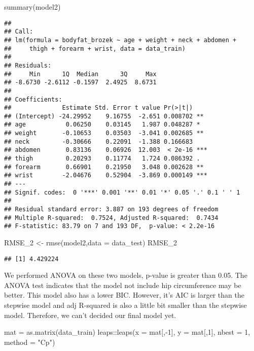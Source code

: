 \documentclass[
]{article}
\newenvironment{Shaded}{\begin{snugshade}}{\end{snugshade}}
\newcommand{\AttributeTok}[1]{\textcolor[rgb]{0.77,0.63,0.00}{#1}}
\newcommand{\DecValTok}[1]{\textcolor[rgb]{0.00,0.00,0.81}{#1}}
\newcommand{\FunctionTok}[1]{\textcolor[rgb]{0.00,0.00,0.00}{#1}}
\newcommand{\NormalTok}[1]{#1}
\newcommand{\OtherTok}[1]{\textcolor[rgb]{0.56,0.35,0.01}{#1}}
\newcommand{\SpecialCharTok}[1]{\textcolor[rgb]{0.00,0.00,0.00}{#1}}
\newcommand{\StringTok}[1]{\textcolor[rgb]{0.31,0.60,0.02}{#1}}
\begin{document}
\begin{Shaded}
\begin{Highlighting}[]
\FunctionTok{summary}\NormalTok{(model2)}
\end{Highlighting}
\end{Shaded}

\begin{verbatim}
## 
## Call:
## lm(formula = bodyfat_brozek ~ age + weight + neck + abdomen + 
##     thigh + forearm + wrist, data = data_train)
## 
## Residuals:
##     Min      1Q  Median      3Q     Max 
## -8.6730 -2.6112 -0.1597  2.4925  8.6731 
## 
## Coefficients:
##              Estimate Std. Error t value Pr(>|t|)    
## (Intercept) -24.29952    9.16755  -2.651 0.008702 ** 
## age           0.06250    0.03145   1.987 0.048287 *  
## weight       -0.10653    0.03503  -3.041 0.002685 ** 
## neck         -0.30666    0.22091  -1.388 0.166683    
## abdomen       0.83136    0.06926  12.003  < 2e-16 ***
## thigh         0.20293    0.11774   1.724 0.086392 .  
## forearm       0.66901    0.21950   3.048 0.002628 ** 
## wrist        -2.04676    0.52904  -3.869 0.000149 ***
## ---
## Signif. codes:  0 '***' 0.001 '**' 0.01 '*' 0.05 '.' 0.1 ' ' 1
## 
## Residual standard error: 3.887 on 193 degrees of freedom
## Multiple R-squared:  0.7524, Adjusted R-squared:  0.7434 
## F-statistic: 83.79 on 7 and 193 DF,  p-value: < 2.2e-16
\end{verbatim}

\begin{Shaded}
\begin{Highlighting}[]
\NormalTok{RMSE\_2 }\OtherTok{\textless{}{-}} \FunctionTok{rmse}\NormalTok{(model2,}\AttributeTok{data =}\NormalTok{ data\_test)}
\NormalTok{RMSE\_2}
\end{Highlighting}
\end{Shaded}

\begin{verbatim}
## [1] 4.429224
\end{verbatim}

We performed ANOVA on these two models, p-value is greater than 0.05.
The ANOVA test indicates that the model not include hip circumference
may be better. This model also has a lower BIC. However, it's AIC is
larger than the stepwise model and adj R-squared is also a little bit
smaller than the stepwise model. Therefore, we can't decided our final
model yet.

\begin{Shaded}
\begin{Highlighting}[]
\NormalTok{mat }\OtherTok{=} \FunctionTok{as.matrix}\NormalTok{(data\_train)}
\NormalTok{leaps}\SpecialCharTok{::}\FunctionTok{leaps}\NormalTok{(}\AttributeTok{x =}\NormalTok{ mat[,}\SpecialCharTok{{-}}\DecValTok{1}\NormalTok{], }\AttributeTok{y =}\NormalTok{ mat[,}\DecValTok{1}\NormalTok{], }\AttributeTok{nbest =} \DecValTok{1}\NormalTok{, }\AttributeTok{method =} \StringTok{"Cp"}\NormalTok{)}
\end{Highlighting}
\end{Shaded}
\end{document}
